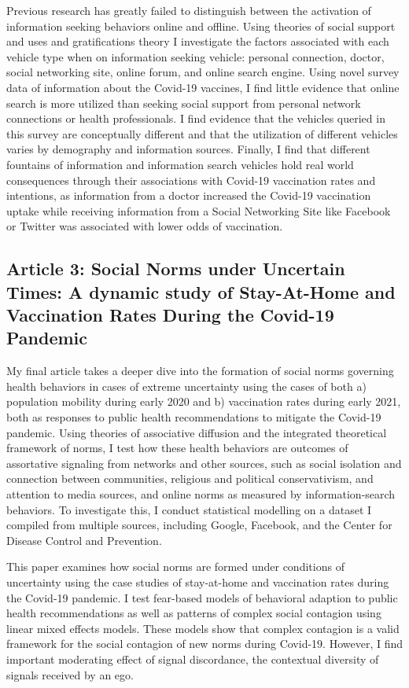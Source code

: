 Previous research has greatly failed to distinguish between the activation of
information seeking behaviors online and offline. Using theories of social
support and uses and gratifications theory I investigate the factors associated
with each vehicle type when on information seeking vehicle: personal connection,
doctor, social networking site, online forum, and online search engine. Using
novel survey data of %
information about the Covid-19 vaccines, I find little evidence that online
search is more utilized than seeking social support from personal network
connections or health professionals. I find evidence that the vehicles queried
in this survey are conceptually different and that the utilization of different
vehicles varies by demography and information sources. Finally, I find that
different fountains of information and information search vehicles hold real
world consequences through their associations with Covid-19 vaccination rates
and intentions, as information from a doctor increased the Covid-19 vaccination
uptake while receiving information from a Social Networking Site like Facebook
or Twitter was associated with lower odds of vaccination.  

\subsection{Article 3: Social Norms under Uncertain Times: A dynamic study of Stay-At-Home and Vaccination Rates During the Covid-19 Pandemic}
My final article takes a deeper dive into the formation of social norms
governing health behaviors in cases of extreme uncertainty using the
cases of both a) population mobility during early 2020 and b)
vaccination rates during early 2021, both as responses to public health
recommendations to mitigate the Covid-19 pandemic. Using theories of
associative diffusion and the integrated theoretical framework of norms,
I test how these health behaviors are outcomes of assortative signaling
from networks and other sources, such as social isolation and connection
between communities, religious and political conservativism, and
attention to media sources, and online norms as measured by
information-search behaviors. To investigate this, I conduct statistical
modelling on a dataset I compiled from multiple sources, including
Google, Facebook, and the Center for Disease Control and Prevention.

This paper examines how social norms are formed under conditions of uncertainty
using the case studies of stay-at-home and vaccination rates during the Covid-19
pandemic.  I test fear-based models of behavioral adaption to public health
recommendations as well as patterns of complex social contagion using linear
mixed effects models. These models show that complex contagion is a valid
framework for the social contagion of new norms during Covid-19. However, I find
important moderating effect of signal discordance, the contextual diversity of
signals received by an ego.
